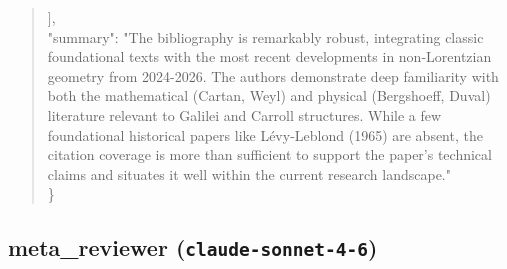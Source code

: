 \documentclass[11pt]{article}
\begin{document}
\begin{quote}
  ],\\
  "summary": "The bibliography is remarkably robust, integrating classic foundational texts with the most recent developments in non-Lorentzian geometry from 2024-2026. The authors demonstrate deep familiarity with both the mathematical (Cartan, Weyl) and physical (Bergshoeff, Duval) literature relevant to Galilei and Carroll structures. While a few foundational historical papers like Lévy-Leblond (1965) are absent, the citation coverage is more than sufficient to support the paper's technical claims and situates it well within the current research landscape."\\
\}\\
\end{quote}

\subsection*{meta_reviewer (\texttt{claude-sonnet-4-6})}
\end{document}
